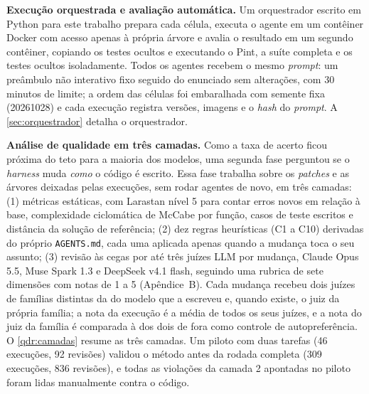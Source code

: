 \textbf{Execução orquestrada e avaliação automática.} Um orquestrador escrito
em Python para este trabalho prepara cada célula, executa o agente em um
contêiner Docker com acesso apenas à própria árvore e avalia o resultado em um
segundo contêiner, copiando os testes ocultos e executando o Pint, a suíte
completa e os testes ocultos isoladamente. Todos os agentes recebem o mesmo
\textit{prompt}: um preâmbulo não interativo fixo seguido do enunciado sem
alterações, com 30 minutos de limite; a ordem das células foi embaralhada com
semente fixa (20261028) e cada execução registra versões, imagens e o
\textit{hash} do \textit{prompt}. A \autoref{sec:orquestrador} detalha o
orquestrador.

\textbf{Análise de qualidade em três camadas.} Como a taxa de acerto ficou
próxima do teto para a maioria dos modelos, uma segunda fase perguntou se o
\textit{harness} muda \emph{como} o código é escrito. Essa fase trabalha sobre
os \textit{patches} e as árvores deixadas pelas execuções, sem rodar agentes de
novo, em três camadas: (1) métricas estáticas, com Larastan nível 5
\cite{larastan2025} para contar erros novos em relação à base, complexidade
ciclomática de McCabe por função, casos de teste escritos e distância da
solução de referência; (2) dez regras heurísticas (C1 a C10) derivadas do
próprio \texttt{AGENTS.md}, cada uma aplicada apenas quando a mudança toca o
seu assunto; (3) revisão às cegas por até três juízes LLM por mudança, Claude
Opus 5.5, Muse Spark 1.3 e DeepSeek v4.1 flash, seguindo uma rubrica de sete
dimensões com notas de 1 a 5 (Apêndice~B). Cada mudança recebeu dois juízes de
famílias distintas da do modelo que a escreveu e, quando existe, o juiz da
própria família; a nota da execução é a média de todos os seus juízes, e a
nota do juiz da família é comparada à dos dois de fora como controle de
autopreferência. O \autoref{qdr:camadas} resume as três camadas. Um piloto com
duas tarefas (46 execuções, 92 revisões) validou o método antes da rodada
completa (309 execuções, 836 revisões), e todas as
violações da camada 2 apontadas no piloto foram lidas manualmente contra o
código.

